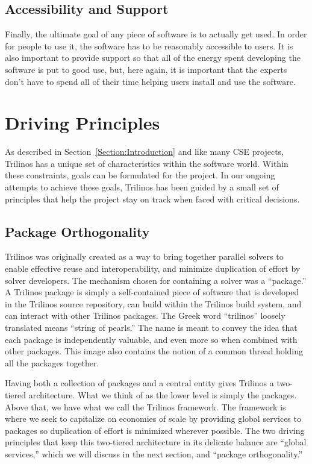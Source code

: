 \documentclass{doublecol}
\begin{document}
\subsection{Accessibility and Support}
Finally, the ultimate goal of any piece of software is to actually
get used. In order for people to use it, the software has to be
reasonably accessible to users.  It is also important to provide
support so that all of the energy spent developing the software is
put to good use, but, here again, it is important that the experts
don't have to spend all of their time helping users install and use
the software.


\section{Driving Principles}
\label{Section:Driving Principles}

As described in Section~\ref{Section:Introduction} and like many CSE
projects, Trilinos has a unique set of characteristics within the
software world. Within these constraints, goals can be
formulated for the project.  In our ongoing attempts to achieve
these goals, Trilinos has been guided by a small set of principles
that help the project stay on track when faced with critical
decisions.

\subsection{Package Orthogonality}

Trilinos was originally created as a way to bring together parallel
solvers to enable effective reuse and interoperability, and minimize
duplication of effort by solver developers.  The mechanism chosen
for containing a solver was a ``package.''  A Trilinos package is
simply a self-contained piece of software that is developed in the
Trilinos source repository, can build within the Trilinos build
system, and can interact with other Trilinos packages. The Greek
word ``trilinos'' loosely translated means ``string of pearls.'' The
name is meant to convey the idea that each package is independently
valuable, and even more so when combined with other packages. This
image also contains the notion of a common thread holding all the
packages together.

Having both a collection of packages and a central entity gives
Trilinos a two-tiered architecture.  What we think of as the lower
level is simply the packages.  Above that, we have what we call the
Trilinos framework.  The framework is where we seek to capitalize on
economies of scale by providing global services to packages so
duplication of effort is minimized wherever possible. The two
driving principles that keep this two-tiered architecture in its
delicate balance are ``global services,'' which we will discuss in
the next section, and ``package orthogonality.''
\end{document}
